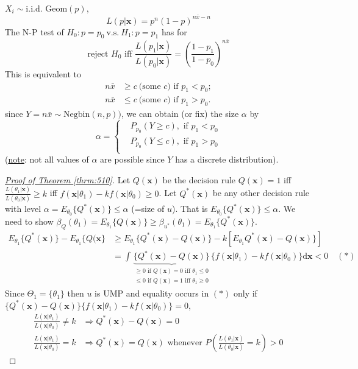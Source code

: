 \documentclass[english, 11pt]{article}
\begin{document}
\begin{exmp}\label{exmp:511}
$X_i\sim\text{i.i.d. Geom}(p)$, 
$$
L(p|\bm{x})=p^n(1-p)^{n\bar{x}-n}
$$
The N-P test of $H_0:p=p_0\ \text{v.s.}\ H_1:p=p_1$ has for
$$
\text{reject $H_0$ iff $\frac{L(p_1|\bm{x})}{L(p_0|\bm{x})}=\left(\frac{1-p_1}{1-p_0}\right)^{n\bar{x}}$}
$$
This is equivalent to 
$$
\begin{aligned}
n\bar{x}&\geqslant c\ \text{(some $c$) if } p_1<p_0;\\
n\bar{x}&\leqslant c\ \text{(some $c$) if } p_1>p_0.
\end{aligned}
$$
since $Y=n\bar{x}\sim\text{Negbin}(n, p))$, we can obtain (or fix) the size $\alpha$ by
$$
\alpha=\left\{\begin{aligned}
&P_{p_0}(Y\geqslant c), \text{ if }p_1<p_0\\
&P_{p_0}(Y\leqslant c), \text{ if }p_1>p_0\\
\end{aligned}\right.
$$
(\underline{note}: not all values of $\alpha$ are possible since $Y$ has a discrete distribution).
\end{exmp}

\begin{proof}[\underline{Proof of Theorem \ref{thrm:510}}]
Let $Q(\bm{x})$ be the decision rule $Q(\bm{x})=1$ iff $\frac{L(\theta_1|\bm{x})}{L(\theta_0|\bm{x})}\geqslant k$ iff $f(\bm{x}|\theta_1)-kf(\bm{x}|\theta_0)\geqslant0$.
Let $Q^*(\bm{x})$ be any other decision rule with level $\alpha=E_{\theta_0}\{Q^*(\bm{x})\}\leqslant\alpha$ (=size of $u$). That is $E_{\theta_0}\{Q^*(\bm{x})\}\leqslant\alpha$. We need to show $\beta_Q(\theta_1)=E_{\theta_1}\{Q(\bm{x})\}\geqslant \beta_{u^*}(\theta_1)=E_{\theta_1}\{Q^*(\bm{x})\}$. 
$$
\begin{aligned}
E_{\theta_1}\{Q^*(\bm{x})\}-E_{\theta_1}\{Q(\bm{x}\}&\geqslant E_{\theta_1}\{Q^*(\bm{x})-Q(\bm{x})\}-k\left[E_{\theta_1}Q^*(\bm{x})-Q(\bm{x})\}\right]\\
&=\int\underbrace{\{Q^*(\bm{x})-Q(\bm{x})\}}_{\begin{aligned}
\geqslant0\text{ if }Q(\bm{x})=0\text{ iff }\theta_1\leqslant0\\
\leqslant0\text{ if }Q(\bm{x})=1\text{ iff }\theta_1\geqslant0
\end{aligned}}\{f(\bm{x}|\theta_1)-kf(\bm{x}|\theta_0)\}\mathrm{d}\bm{x}<0\quad(*)
\end{aligned}
$$
Since $\Theta_1=\{\theta_1\}$ then $u$ is UMP and equality occurs in $(*)$ only if $\{Q^*(\bm{x})-Q(\bm{x})\}\{f(\bm{x}|\theta_1)-kf(\bm{x}|\theta_0)\}=0$,
$$
\begin{aligned}
\frac{L(\bm{x}|\theta_1)}{L(\bm{x}|\theta_0)}\not=k&\Rightarrow Q^*(\bm{x})-Q(\bm{x})=0\\
\frac{L(\bm{x}|\theta_1)}{L(\bm{x}|\theta_0)}=k&\Rightarrow Q^*(\bm{x})=Q(\bm{x})\text{ whenever }P\left(\frac{L(\theta_1|\bm{x})}{L(\theta_0|\bm{x})}=k\right)>0
\end{aligned}
$$
\end{proof}
\end{document}
